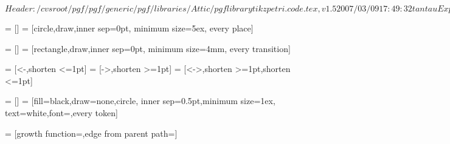 %
%
%

\ProvidesFileRCS[v\pgfversion] $Header: /cvsroot/pgf/pgf/generic/pgf/libraries/Attic/pgflibrarytikzpetri.code.tex,v 1.5 2007/03/09 17:49:32 tantau Exp $



=           []
=                 [circle,draw,inner sep=0pt,
                                    minimum size=5ex,
                                    every place]



=      []
=            [rectangle,draw,inner sep=0pt,
                                    minimum size=4mm,
                                    every transition]



=                   [<-,shorten <=1pt]
=                  [->,shorten >=1pt]
=          [<->,shorten >=1pt,shorten <=1pt]




=           []
=                 [fill=black,draw=none,circle,
                                    inner sep=0.5pt,minimum size=1ex,
                                    text=white,font=\pgfutil@font@tiny,every token]

\def\tikz@token@distance{1.5ex}

=   [growth function=\tikz@grow@tokens,edge from parent path=]






